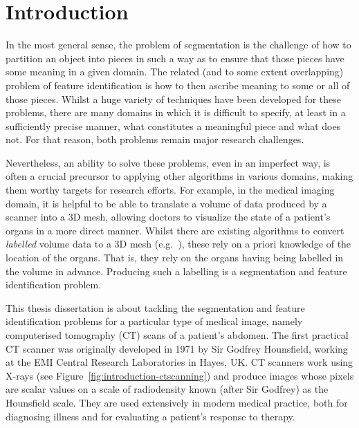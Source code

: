 \chapter{Introduction}
\label{chap:introduction}


In the most general sense, the problem of segmentation is the challenge of how to partition an object into pieces in such a way as to ensure that those pieces have some meaning in a given domain. The related (and to some extent overlapping) problem of feature identification is how to then ascribe meaning to some or all of those pieces. Whilst a huge variety of techniques have been developed for these problems, there are many domains in which it is difficult to specify, at least in a sufficiently precise manner, what constitutes a meaningful piece and what does not. For that reason, both problems remain major research challenges.

Nevertheless, an ability to solve these problems, even in an imperfect way, is often a crucial precursor to applying other algorithms in various domains, making them worthy targets for research efforts. For example, in the medical imaging domain, it is helpful to be able to translate a volume of data produced by a scanner into a 3D mesh, allowing doctors to visualize the state of a patient's organs in a more direct manner. Whilst there are existing algorithms to convert \emph{labelled} volume data to a 3D mesh (e.g.~\cite{wu03}), these rely on a priori knowledge of the location of the organs. That is, they rely on the organs having being labelled in the volume in advance. Producing such a labelling is a segmentation and feature identification problem.

This thesis dissertation is about tackling the segmentation and feature identification problems for a particular type of medical image, namely computerised tomography (CT) scans of a patient's abdomen. The first practical CT scanner was originally developed in 1971 by Sir Godfrey Hounsfield, working at the EMI Central Research Laboratories in Hayes, UK. CT scanners work using X-rays (see Figure~\ref{fig:introduction-ctscanning}) and produce images whose pixels are scalar values on a scale of radiodensity known (after Sir Godfrey) as the Hounsfield scale. They are used extensively in modern medical practice, both for diagnosing illness and for evaluating a patient's response to therapy.

